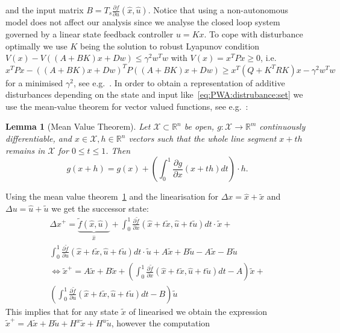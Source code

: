 \documentclass[letterpaper, 10pt, conference]{ieeeconf} %
\newtheorem{thm}{Lemma}[section]
\begin{document}
and the input matrix $B = T_s \frac{\partial f}{\partial u}(\hat x,\hat u)$. 
Notice that using a non-autonomous model does not affect our analysis since we analyse the closed loop system
governed by a linear state feedback controller $u=Kx$. To cope with disturbance optimally we use $K$ 
being the solution to robust Lyapunov condition $V(x)-V((A+BK)x+Dw)\leq \gamma^2w^Tw$ with $V(x)=x^T P x\geq0$, i.e.
$x^TPx - ((A+BK)x+Dw)^TP((A+BK)x+Dw)\geq x^T(Q+K^TRK)x -\gamma^2 w^Tw$ for a minimised $\gamma^2$, 
see e.g.~\cite{Boyd:94}.
In order to obtain a 
representation of additive disturbances depending on the state and input like~\eqref{eq:PWA:distrubance:set}
we use the mean-value theorem for vector valued functions, see e.g.~\cite{Apostol:1974}:
%
%
\begin{thm}[Mean Value Theorem]\label{thm:mean:value:theorem}
Let $\mathcal X\subset\mathbb R^n$ be open, $g : \mathcal X \rightarrow\mathbb R^m$ continuously differentiable, 
and $x \in\mathcal X, h \in\mathbb R^n$ vectors such that the 
whole line segment $x + th$ remains in $\mathcal X$ for $0 \leq t \leq 1$. Then
\begin{equation}
	g(x+h) = g(x) + \left(\int_0^1 \frac{\partial g}{\partial x}(x+th)dt\right)\cdot h.
\end{equation}
\end{thm}
%
%
Using the mean value theorem~\ref{thm:mean:value:theorem}
and the linearisation for $\Delta x = \hat x + \tilde x$ and $\Delta u = \hat u + \tilde u$ we
get the successor state:
%
\begin{equation}
	\begin{split}
	\Delta x^+ = \underbrace{\tilde f(\hat x, \hat u)}_{\hat x} + \int_0^1\frac{\partial\tilde 
	f}{\partial x}(\hat x + t\tilde x
	,\hat u + t\tilde u)dt\cdot \tilde x +\\
	 \int_0^1\frac{\partial\tilde f}{\partial u}(\hat x + t\tilde x
	,\hat u + t\tilde u)dt\cdot \tilde u + A \tilde x + B \tilde u - A \tilde x - B\tilde u\\
	\Leftrightarrow \tilde x^+ = A\tilde x + B \tilde x +\left(
	\int_0^1\frac{\partial\tilde f}{\partial x}(\hat x + t\tilde x,\hat u + t\tilde u)dt - A
	\right)\tilde x + \\ \left(
	\int_0^1\frac{\partial\tilde f}{\partial u}(\hat x + t\tilde x,\hat u + t\tilde u)dt - B
	\right)\tilde u
	\end{split}
\end{equation}
%
This implies that for any state $\tilde x$ of linearised we obtain the expression
$\tilde x^+ = A\tilde x+B\tilde u + H^x\tilde x + H^u \tilde u$, however the computation
\end{document}
